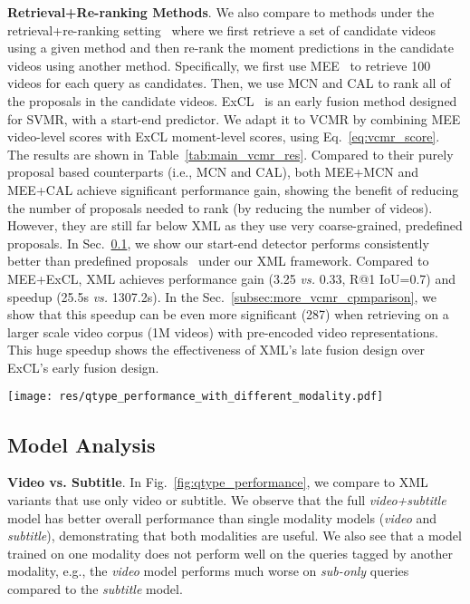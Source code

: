 \documentclass[runningheads]{llncs}
\begin{document}
\kern1mm
\noindent\textbf{Retrieval+Re-ranking Methods}.
We also compare to methods under the retrieval+re-ranking setting~\cite{escorcia2019temporal} where we first retrieve a set of candidate videos using a given method and then re-rank the moment predictions in the candidate videos using another method. 
Specifically, we first use MEE~\cite{miech2018learning} to retrieve 100 videos for each query as candidates. 
Then, we use MCN and CAL to rank all of the proposals in the candidate videos. ExCL~\cite{ghosh2019excl} is an early fusion method designed for SVMR, with a start-end predictor. 
We adapt it to VCMR by combining MEE video-level scores with ExCL moment-level scores, using Eq.~\ref{eq:vcmr_score}. 
The results are shown in Table~\ref{tab:main_vcmr_res}. 
Compared to their purely proposal based counterparts (i.e., MCN and CAL), both MEE+MCN and MEE+CAL achieve significant performance gain, showing the benefit of reducing the number of proposals needed to rank (by reducing the number of videos). 
However, they are still far below XML as they use very coarse-grained, predefined proposals.
In Sec.~\ref{subsec:model_analysis}, we show our start-end detector performs consistently better than predefined proposals~\cite{escorcia2019temporal,zhao2017temporal} under our XML framework.
Compared to MEE+ExCL, XML achieves  performance gain (3.25 \textit{vs.} 0.33, R@1 IoU=0.7) and  speedup (25.5s \textit{vs.} 1307.2s). 
In the Sec.~\ref{subsec:more_vcmr_cpmparison}, we show that this speedup can be even more significant (287) when retrieving on a larger scale video corpus (1M videos) with pre-encoded video representations.
This huge speedup shows the effectiveness of XML's late fusion design over ExCL's early fusion design.

\begin{figure*}[!t]
  \centering
  \texttt{[image: res/qtype\_performance\_with\_different\_modality.pdf]}
  \caption{Performance breakdown of XML models that use only \textit{video}, \textit{subtitle}, or both as inputs, by different query types (with percentage of queries shown in brackets). The performance is evaluated on TVR \textit{val} set for VCMR}
  \label{fig:qtype_performance}
\end{figure*}


\subsection{Model Analysis}\label{subsec:model_analysis}

\noindent\textbf{Video vs. Subtitle}.
In Fig.~\ref{fig:qtype_performance}, we compare to XML variants that use only video or subtitle. 
We observe that the full \textit{video+subtitle} model has better overall performance than single modality models (\textit{video} and \textit{subtitle}), demonstrating that both modalities are useful. 
We also see that a model trained on one modality does not perform well on the queries tagged by another modality, e.g., the \textit{video} model performs much worse on \textit{sub-only} queries compared to the \textit{subtitle} model. 
\end{document}
